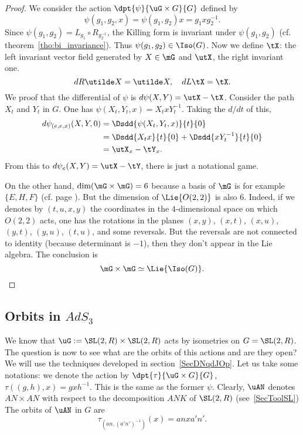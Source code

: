 \begin{proof}

We consider the action $\dpt{\psi}{\uG\times G}{G}$ defined by
\[
   \psi(g_1,g_2,x)=\psi(g_1,g_2)x=g_1xg_2^{-1}.
\]
Since $\psi(g_1,g_2)=L_{g_1}\circ R_{g_2^{-1}}$, the Killing form is invariant under $\psi(g_1,g_2)$ (cf. theorem~\ref{tho:bi_invariance}). Thus $\psi(g_1,g_2)\in\Iso(G)$. Now we define $\tX$: the left invariant vector field generated by $X\in\mG$ and $\utX$, the right invariant one.
\[
   dR\utilde X=\utilde X,\quad dL\tX=\tX.
\]
We proof that the differential of $\psi$ is $d\psi(X,Y)=\utX-\tX$. Consider the path $X_t$ and $Y_t$ in $G$. One has $\psi(X_t,Y_t,x)=X_txY_t^{-1}$. Taking the $d/dt$ of this,
\begin{equation}
\begin{split}
d\psi_{(e,e,x)}(X,Y,0)&=\Dsdd{\psi(X_t,Y_t,x)}{t}{0}\\
                      &=\Dsdd{X_tx}{t}{0}+\Dsdd{xY_t^{-1}}{t}{0}\\
                      &=\utX_x-\tY_x.
\end{split}
\end{equation}
From this to $d\psi_e(X,Y)=\utX-\tY$, there is just a notational game.

On the other hand, $\dim(\mG\times\mG)=6$ because a basis of $\mG$ is for example $\{E,H,F\}$ (cf. page \pageref{SecToolSL}). But the dimension of $\Lie{O(2,2)}$ is also $6$. Indeed, if we denotes by $(t,u,x,y)$ the coordinates in the $4$-dimensional space on which $O(2,2)$ acts, one has the rotations in the planes $(x,y)$, $(x,t)$, $(x,u)$, $(y,t)$, $(y,u)$, $(t,u)$, and some reversals. But the reversals are not connected to identity (because determinant is $-1$), then they don't appear in the Lie algebra.
The conclusion is
\[
\mG\times\mG\simeq\Lie{\Iso(G)}.
\]

\end{proof}

\subsection{Orbits in \texorpdfstring{$AdS_3$}{AdS3}}

We know that $\uG:=\SL(2,R)\times\SL(2,R)$ acts by isometries on $G=\SL(2,R)$. The question is now to see what are the orbits of this actions and are they open? We will use the techniques developed in section~\ref{SecDNqdJOp}. Let us take some notations: we denote the action by $\dpt{\tau}{\uG\times G}{G}$, $\tau((g,h),x)=gxh^{-1}$. This is the same as the former $\psi$. Clearly, $\uAN$ denotes $AN\times AN$ with respect to the decomposition $ANK$ of $\SL(2,R)$ (see~\ref{SecToolSL}) The orbits of $\uAN$ in $G$ are
\[
   \tau_{ (an,(a'n')^{-1}) }(x)=anxa'n'.
\]

